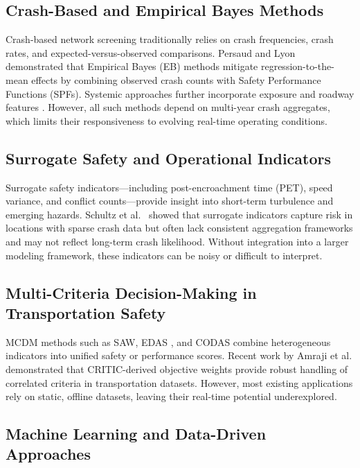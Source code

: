 \documentclass[conference]{IEEEtran}
\begin{document}
\subsection{Crash-Based and Empirical Bayes Methods}

Crash-based network screening traditionally relies on crash frequencies, crash rates,
and expected-versus-observed comparisons. Persaud and Lyon \cite{persaud2007}
demonstrated that Empirical Bayes (EB) methods mitigate regression-to-the-mean
effects by combining observed crash counts with Safety Performance Functions (SPFs).
Systemic approaches further incorporate exposure and roadway features
\cite{montella2020systemic}. However, all such methods depend on multi-year crash
aggregates, which limits their responsiveness to evolving real-time operating
conditions.

\subsection{Surrogate Safety and Operational Indicators}

Surrogate safety indicators—including post-encroachment time (PET), speed variance,
and conflict counts—provide insight into short-term turbulence and emerging hazards.
Schultz et al.\ \cite{schultz2025_surrogate} showed that surrogate indicators capture
risk in locations with sparse crash data but often lack consistent aggregation frameworks
and may not reflect long-term crash likelihood. Without integration into a larger
modeling framework, these indicators can be noisy or difficult to interpret.

\subsection{Multi-Criteria Decision-Making in Transportation Safety}

MCDM methods such as SAW, EDAS \cite{EDAS}, and CODAS \cite{CODAS} combine heterogeneous
indicators into unified safety or performance scores. Recent work by Amraji et al.
\cite{Amraji2025CombinedSafetyIndex} demonstrated that CRITIC-derived objective weights
provide robust handling of correlated criteria in transportation datasets. However,
most existing applications rely on static, offline datasets, leaving their real-time
potential underexplored.

\subsection{Machine Learning and Data-Driven Approaches}
\end{document}
